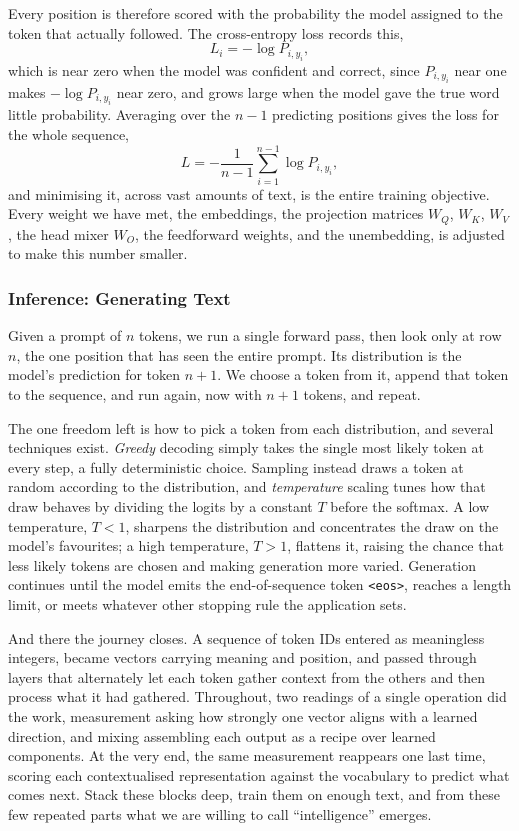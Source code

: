 \documentclass[11pt]{article}
\begin{document}
Every position is therefore scored with the probability the model assigned to the token that actually followed. The cross-entropy loss records this,
\[
L_i = -\log P_{i, y_i},
\]
which is near zero when the model was confident and correct, since $P_{i,y_i}$ near one makes $-\log P_{i,y_i}$ near zero, and grows large when the model gave the true word little probability. Averaging over the $n-1$ predicting positions gives the loss for the whole sequence,
\[
L = -\frac{1}{n-1} \sum_{i=1}^{n-1} \log P_{i, y_i},
\]
and minimising it, across vast amounts of text, is the entire training objective. Every weight we have met, the embeddings, the projection matrices $W_Q$, $W_K$, $W_V$, the head mixer $W_O$, the feedforward weights, and the unembedding, is adjusted to make this number smaller.

\subsubsection*{Inference: Generating Text}

Given a prompt of $n$ tokens, we run a single forward pass, then look only at row $n$, the one position that has seen the entire prompt. Its distribution is the model's prediction for token $n+1$. We choose a token from it, append that token to the sequence, and run again, now with $n+1$ tokens, and repeat. 

The one freedom left is how to pick a token from each distribution, and several techniques exist. \textit{Greedy} decoding simply takes the single most likely token at every step, a fully deterministic choice. Sampling instead draws a token at random according to the distribution, and \textit{temperature} scaling tunes how that draw behaves by dividing the logits by a constant $T$ before the softmax. A low temperature, $T < 1$, sharpens the distribution and concentrates the draw on the model's favourites; a high temperature, $T > 1$, flattens it, raising the chance that less likely tokens are chosen and making generation more varied. Generation continues until the model emits the end-of-sequence token \texttt{<eos>}, reaches a length limit, or meets whatever other stopping rule the application sets.

\medskip

And there the journey closes. A sequence of token IDs entered as meaningless integers, became vectors carrying meaning and position, and passed through layers that alternately let each token gather context from the others and then process what it had gathered. Throughout, two readings of a single operation did the work, measurement asking how strongly one vector aligns with a learned direction, and mixing assembling each output as a recipe over learned components. At the very end, the same measurement reappears one last time, scoring each contextualised representation against the vocabulary to predict what comes next. Stack these blocks deep, train them on enough text, and from these few repeated parts what we are willing to call ``intelligence'' emerges.
\end{document}
